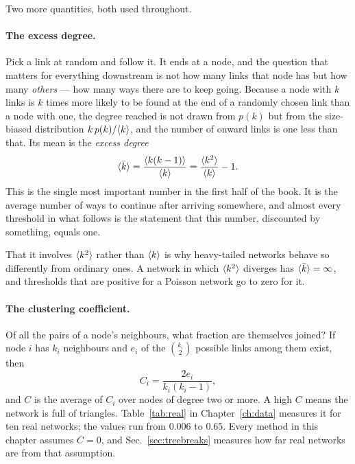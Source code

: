 Two more quantities, both used throughout.

\paragraph{The excess degree.} Pick a link at random and follow it. It ends at
a node, and the question that matters for everything downstream is not how many
links that node has but how many \emph{others} --- how many ways there are to
keep going. Because a node with $k$ links is $k$ times more likely to be found
at the end of a randomly chosen link than a node with one, the degree reached is
not drawn from $p(k)$ but from the size-biased distribution
$k\,p(k)/\langle k \rangle$, and the number of onward links is one less than that. Its
mean is the \emph{excess degree}
\begin{equation}
  \langle \bar k \rangle=\frac{\langle k(k-1) \rangle}{\langle k \rangle}
              =\frac{\langle k^{2} \rangle}{\langle k \rangle}-1.
  \label{eq:excessdeg}
\end{equation}
This is the single most important number in the first half of the book. It is
the average number of ways to continue after arriving somewhere, and almost
every threshold in what follows is the statement that this number, discounted by
something, equals one.

That it involves $\langle k^{2} \rangle$ rather than $\langle k \rangle$ is why heavy-tailed
networks behave so differently from ordinary ones. A network in which
$\langle k^{2} \rangle$ diverges has $\langle \bar k \rangle=\infty$, and thresholds that are
positive for a Poisson network go to zero for it.

\paragraph{The clustering coefficient.} Of all the pairs of a node's neighbours,
what fraction are themselves joined? If node $i$ has $k_{i}$ neighbours and
$e_{i}$ of the $\binom{k_{i}}{2}$ possible links among them exist, then
\begin{equation}
  C_{i}=\frac{2e_{i}}{k_{i}(k_{i}-1)},
  \label{eq:clustering}
\end{equation}
and $C$ is the average of $C_{i}$ over nodes of degree two or more. A high $C$
means the network is full of triangles. Table~\ref{tab:real} in
Chapter~\ref{ch:data} measures it for ten real networks; the values run from
$0.006$ to $0.65$. Every method in this chapter assumes $C=0$, and
Sec.~\ref{sec:treebreaks} measures how far real networks are from that
assumption.

